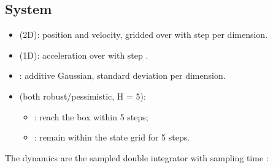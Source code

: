 \documentclass[a4paper,10pt,english]{sphinxmanual}
\begin{document}
\subsection{System}
\label{\detokenize{benchmarks/IC:system}}\begin{itemize}
\item {} 
\sphinxAtStartPar
{} (2D): position and velocity, gridded over  with step
 per dimension.

\item {} 
\sphinxAtStartPar
{} (1D): acceleration over \sphinxcode{\sphinxupquote{{[}\sphinxhyphen{}1,1{]}}} with step .

\item {} 
\sphinxAtStartPar
{}: additive Gaussian, standard deviation  per dimension.

\item {} 
\sphinxAtStartPar
{} (both robust/pessimistic, H = 5):
\begin{itemize}
\item {} 
\sphinxAtStartPar
{}: reach the box  within 5 steps;

\item {} 
\sphinxAtStartPar
{}: remain within the state grid for 5 steps.

\end{itemize}

\end{itemize}

\sphinxAtStartPar
The dynamics are the sampled double integrator with sampling time :
\end{document}
